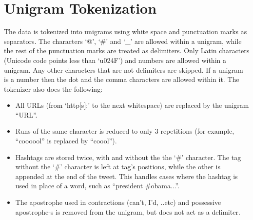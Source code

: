 \documentclass[letterpaper,12pt,titlepage,oneside,final]{book}
\begin{document}
\chapter[Unigram Tokenization]{Unigram Tokenization}
\label{AppendixA}
The data is tokenized into unigrams using white space and punctuation marks as separators. 
The characters `@', `\#' and `\_' are allowed within a unigram, 
while the rest of the punctuation marks are treated as delimiters. %
Only Latin characters  (Unicode code points less than `u024F') and numbers are allowed within a unigram.
Any other characters that are not delimiters are skipped.
If a unigram is a number then the dot and the comma characters
are allowed within it.
The tokenizer also does the following:
\begin{itemize}
\item All URLs (from `http[s]:' to the next whitespace)  are replaced by the unigram ``URL''. 
\item Runs of the same character is reduced to only 3 repetitions (for example, ``coooool'' is replaced by  ``coool''). 
\item Hashtags are stored twice, with and without the the `\#' character. 
The tag without the `\#' character is left at tag's positions, while the other is appended at the end of the tweet.
This handles cases where the hashtag is used in place of a word, such as ``president \#obama...''.
 \item The apostrophe used in contractions (can't, I'd, ..etc) and possessive apostrophe-s is removed from the unigram, but does not act as a delimiter.
\end{itemize}

 
\end{document}
